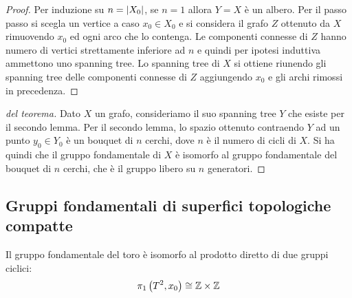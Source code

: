 \documentclass[]{article}
\begin{document}
\begin{proof} \nl
    Per induzione su $n = \left| X_0 \right|$, se $n = 1$ allora $Y = X$ \`e un albero. \nl
    Per il passo passo si scegla un vertice a caso $x_0 \in X_0$ e si considera il grafo
    $Z$ ottenuto da $X$ rimuovendo $x_0$ ed ogni arco che lo contenga. \nl
    Le componenti connesse di $Z$ hanno numero di vertici strettamente inferiore ad $n$ e quindi
    per ipotesi induttiva ammettono uno spanning tree. \nl
    Lo spanning tree di $X$ si ottiene riunendo gli spanning tree delle componenti connesse di $Z$ aggiungendo $x_0$ e gli archi rimossi in precedenza.
\end{proof}

\begin{proof} [del teorema] \nl
    Dato $X$ un grafo, consideriamo il suo spanning tree $Y$ che esiste per il secondo lemma.
    Per il secondo lemma, lo spazio ottenuto contraendo $Y$ ad un punto $y_0 \in Y_0$ \`e un bouquet
    di $n$ cerchi, dove $n$ \`e il numero di cicli di $X$. \nl
    Si ha quindi che il gruppo fondamentale di $X$ \`e isomorfo al gruppo fondamentale del bouquet di $n$ cerchi, che \`e il gruppo libero su $n$ generatori.
\end{proof}

\subsection{Gruppi fondamentali di superfici topologiche compatte}

\begin{proposition}  \nl

\end{proposition}

\begin{proposition}  \nl
    Il gruppo fondamentale del toro \`e isomorfo al prodotto diretto di due gruppi ciclici:
    \[
        \pi_1\left(T^{2}, x_0\right) \cong \mathbb{Z} \times \mathbb{Z}
    \]
\end{proposition}
\end{document}
